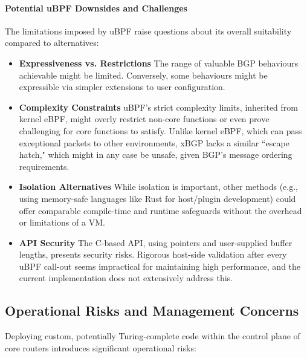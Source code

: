 \paragraph{Potential uBPF Downsides and Challenges}
The limitations imposed by uBPF raise questions about its overall suitability compared to alternatives:
\begin{itemize}
    \item \textbf{Expressiveness vs. Restrictions} The range of valuable BGP behaviours achievable might be limited. Conversely, some behaviours might be expressible via simpler extensions to user configuration.
    \item \textbf{Complexity Constraints} uBPF's strict complexity limits, inherited from kernel eBPF, might overly restrict non-core functions or even prove challenging for core functions to satisfy. Unlike kernel eBPF, which can pass exceptional packets to other environments, xBGP lacks a similar ``escape hatch," which might in any case be unsafe, given BGP's message ordering requirements.
    \item \textbf{Isolation Alternatives} While isolation is important, other methods (e.g., using memory-safe languages like Rust for host/plugin development) could offer comparable compile-time and runtime safeguards without the overhead or limitations of a VM.
    \item \textbf{API Security} The C-based API, using pointers and user-supplied buffer lengths, presents security risks. Rigorous host-side validation after every uBPF call-out seems impractical for maintaining high performance, and the current implementation does not extensively address this.
\end{itemize}


\subsection{Operational Risks and Management Concerns}

Deploying custom, potentially Turing-complete code within the control plane of core routers introduces significant operational risks:

